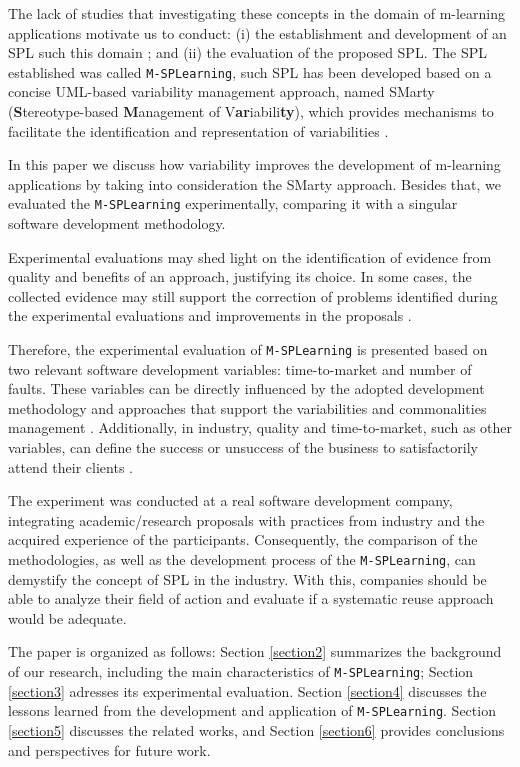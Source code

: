 The lack of studies that investigating these concepts in the domain of m-learning applications motivate us to conduct: (i) the establishment and development of an SPL such this domain \cite{falvojr14,falvojr14b}; and (ii) the evaluation of the proposed SPL. The SPL established was called \texttt{M-SPLear\allowbreak ning}, such SPL has been developed based on a concise UML-based variability management approach, named SMarty  (\textbf{S}tereotype-based \textbf{M}anagement of V\textbf{ar}iabili\textbf{ty}), which provides mechanisms to facilitate the identification and representation of variabilities \cite{marcolino13, marcolino14a, marcolino14b, bera15, marcolino2017}.

In this paper we discuss how variability improves the development of m-learning applications by taking into consideration the SMarty approach. Besides that, we evaluated the \texttt{M-SPLear\allowbreak ning} experimentally, comparing it with a singular software development methodology. 

Experimental evaluations may shed light on the identification of evidence from quality and benefits of an approach, justifying its choice. In some cases, the collected evidence may still support the correction of problems identified during the experimental evaluations and improvements in the proposals \cite{wohlin12,juristo10}.

Therefore, the experimental evaluation of \texttt{M-SPLear\allowbreak ning} is presented based on two relevant software development variables: time-to-market and number of faults. These variables can be directly influenced by the adopted development methodology and approaches that support the variabilities and commonalities management \cite{hubaux10,capilla13}. Additionally, in industry, quality and time-to-market, such as other variables, can define the success or unsuccess of the business to satisfactorily attend their clients \cite{hubaux10}.

The experiment was conducted at a real software development company, integrating academic/research proposals with practices from industry and the acquired experience of the participants. Consequently, the comparison of the methodologies, as well as the development process of the \texttt{M-SPLear\allowbreak ning}, can demystify the concept of SPL in the industry. With this, companies should be able to analyze their field of action and evaluate if a systematic reuse approach would be adequate.

The paper is organized as follows: Section \ref{section2} summarizes the background of our research, including the main characteristics of \texttt{M-SPLear\allowbreak ning}; Section \ref{section3} adresses its experimental evaluation. Section \ref{section4} discusses the lessons learned from the development and application of \texttt{M-SPLear\allowbreak ning}. Section \ref{section5} discusses the related works, and Section \ref{section6} provides conclusions and perspectives for future work.

